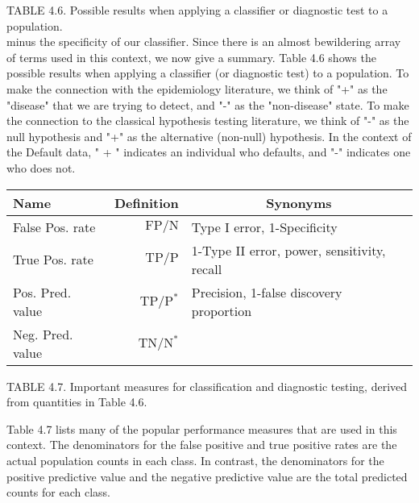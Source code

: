 \documentclass[10pt]{article}
\begin{document}
TABLE 4.6. Possible results when applying a classifier or diagnostic test to a population.\\
minus the specificity of our classifier. Since there is an almost bewildering array of terms used in this context, we now give a summary. Table 4.6 shows the possible results when applying a classifier (or diagnostic test) to a population. To make the connection with the epidemiology literature, we think of "+" as the "disease" that we are trying to detect, and "-" as the "non-disease" state. To make the connection to the classical hypothesis testing literature, we think of "-" as the null hypothesis and "+" as the alternative (non-null) hypothesis. In the context of the Default data, " + " indicates an individual who defaults, and "-" indicates one who does not.


\begin{center}
\begin{tabular}{l|r|l}
\hline
Name & Definition & \multicolumn{1}{c}{Synonyms} \\
\hline
False Pos. rate & $\mathrm{FP} / \mathrm{N}$ & Type I error, 1-Specificity \\
True Pos. rate & $\mathrm{TP} / \mathrm{P}$ & 1-Type II error, power, sensitivity, recall \\
Pos. Pred. value & $\mathrm{TP} / \mathrm{P}^{*}$ & Precision, 1-false discovery proportion \\
Neg. Pred. value & $\mathrm{TN} / \mathrm{N}^{*}$ &  \\
\hline
\end{tabular}
\end{center}

TABLE 4.7. Important measures for classification and diagnostic testing, derived from quantities in Table 4.6.

Table 4.7 lists many of the popular performance measures that are used in this context. The denominators for the false positive and true positive rates are the actual population counts in each class. In contrast, the denominators for the positive predictive value and the negative predictive value are the total predicted counts for each class.
\end{document}
